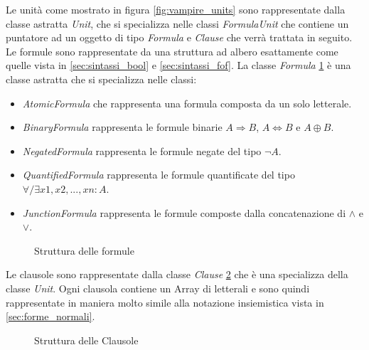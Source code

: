 \documentclass[./main.tex]{subfiles}
\begin{document}
Le unità come mostrato in figura \ref{fig:vampire_units} sono rappresentate dalla classe astratta \textit{Unit},
che si specializza nelle classi \textit{FormulaUnit} che contiene un puntatore ad un oggetto di tipo \textit{Formula}
e \textit{Clause} che verrà trattata in seguito.
Le formule sono rappresentate da una struttura ad albero esattamente come quelle vista in \ref{sec:sintassi_bool} e \ref{sec:sintassi_fof}.
La classe \textit{Formula} \ref{fig:vampire_formulas} è una classe astratta che si specializza nelle classi:
\begin{itemize}
    \item \textit{AtomicFormula} che rappresenta una formula composta da un solo letterale.
    \item \textit{BinaryFormula} rappresenta le formule binarie $A \Rightarrow B$, $A \Leftrightarrow B$ e $A \oplus B$.
    \item \textit{NegatedFormula} rappresenta le formule negate del tipo $\lnot A$.
    \item \textit{QuantifiedFormula} rappresenta le formule quantificate del tipo $\forall/\exists x1, x2, ..., xn : A$.
    \item \textit{JunctionFormula} rappresenta le formule composte dalla concatenazione di $\land$ e $\lor$.
\end{itemize}

\begin{figure}[H]
    \centering
    \scalebox{0.5}{
        
    }
    \caption{Struttura delle formule}
    \label{fig:vampire_formulas}
\end{figure}

Le clausole sono rappresentate dalla classe \textit{Clause} \ref{fig:vampire_clauses} che è una specializza della classe \textit{Unit}.
Ogni clausola contiene un Array di letterali e sono quindi rappresentate in maniera molto simile alla notazione insiemistica 
vista in \ref{sec:forme_normali}.

\begin{figure}[H]
    \centering
    \scalebox{0.55}{
        
    }
    
    \caption{Struttura delle Clausole}
    \label{fig:vampire_clauses}
\end{figure}
\end{document}
